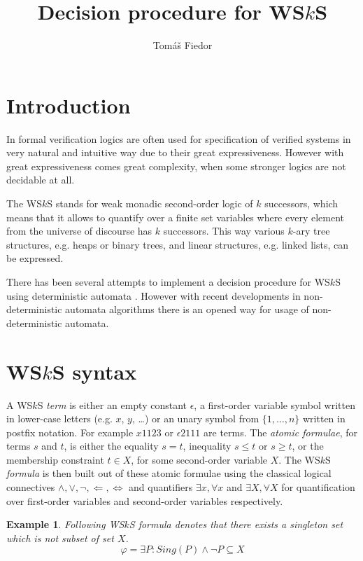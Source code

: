 \documentclass{eeict}
\title{Decision procedure for WS$k$S}
\author{Tomáš Fiedor}
\newtheorem{example}{Example}[section]
\begin{document}
\maketitle

\section{Introduction}

In formal verification logics are often used for specification of verified
systems in very natural and intuitive way due to their great expressiveness.
However with great expressiveness comes great complexity, when some stronger
logics are not decidable at all.

The WS$k$S \cite{wsks} stands for weak monadic second-order logic of $k$
successors, which means that it allows to quantify over a finite set variables where every element
from the universe of discourse has $k$ successors. This way various $k$-ary tree
structures, e.g. heaps or binary trees, and linear structures, e.g. linked
lists, can be expressed.

There has been several attempts to implement a decision procedure for WS$k$S
using deterministic automata \cite{mona}. However with recent
developments in non-deterministic automata algorithms there is an opened way
for usage of non-deterministic automata.

\section{WS$k$S syntax}

A WS$k$S \emph{term} is either an empty constant $\epsilon$, a first-order
variable symbol written in lower-case letters (e.g. $x$, $y$, \ldots) or an
unary symbol from $\{1,\ldots,n\}$ written in postfix notation. For example
$x1123$ or $\epsilon 2111$ are terms. The \emph{atomic formulae}, for terms $s$
and $t$, is either the equality $s = t$, inequality $s \leq t$ or $s \geq t$, or the membership constraint $t \in
X$, for some second-order variable $X$. The WS$k$S \emph{formula} is then built
out of these atomic formulae using the classical logical connectives $\wedge, \vee, \neg, \Leftarrow, \Leftrightarrow$
and quantifiers $\exists x, \forall x$ and $\exists X, \forall X$ for
quantification over first-order variables and second-order variables
respectively.

\begin{example} Following WS$k$S formula denotes that there exists a singleton
set which is not subset of set $X$.
\begin{equation}
 \varphi = \exists P: Sing(P) \wedge\neg P \subseteq X \label{varphi}
\end{equation}
\end{example}
\end{document}
